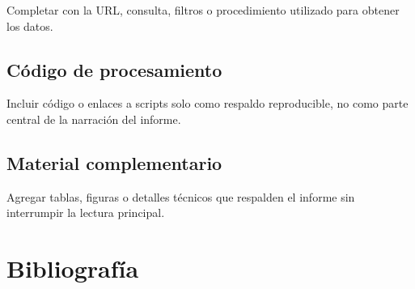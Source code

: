\documentclass[
  spanish,
  letterpaper,
  DIV=11,
  numbers=noendperiod]{scrartcl}
\begin{document}
Completar con la URL, consulta, filtros o procedimiento utilizado para
obtener los datos.

\subsection{Código de procesamiento}\label{cuxf3digo-de-procesamiento}

Incluir código o enlaces a scripts solo como respaldo reproducible, no
como parte central de la narración del informe.

\subsection{Material complementario}\label{material-complementario}

Agregar tablas, figuras o detalles técnicos que respalden el informe sin
interrumpir la lectura principal.

\section{Bibliografía}\label{bibliografuxeda}
\end{document}
